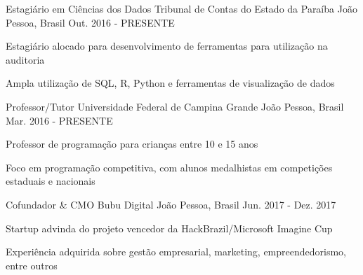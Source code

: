 

\begin{cventries}
  \cventry
    {Estagiário em Ciências dos Dados} %
    {Tribunal de Contas do Estado da Paraíba} %
    {João Pessoa, Brasil} %
    {Out. 2016 - PRESENTE} %
    {
      \begin{cvitems} %
        \item {Estagiário alocado para desenvolvimento de ferramentas para utilização na auditoria}
        \item {Ampla utilização de SQL, R, Python e ferramentas de visualização de dados}
      \end{cvitems}
    }

  \cventry
    {Professor/Tutor} %
    {Universidade Federal de Campina Grande} %
    {João Pessoa, Brasil} %
    {Mar. 2016 - PRESENTE} %
    {
      \begin{cvitems} %
        \item {Professor de programação para crianças entre 10 e 15 anos}
        \item {Foco em programação competitiva, com alunos medalhistas em competições estaduais e nacionais}
      \end{cvitems}
    }

      \cventry
        {Cofundador \& CMO} %
        {Bubu Digital} %
        {João Pessoa, Brasil} %
        {Jun. 2017 - Dez. 2017} %
        {
          \begin{cvitems} %
            \item {Startup advinda do projeto vencedor da HackBrazil/Microsoft Imagine Cup}
            \item {Experiência adquirida sobre gestão empresarial, marketing, empreendedorismo, entre outros}
          \end{cvitems}
        }


\end{cventries}
